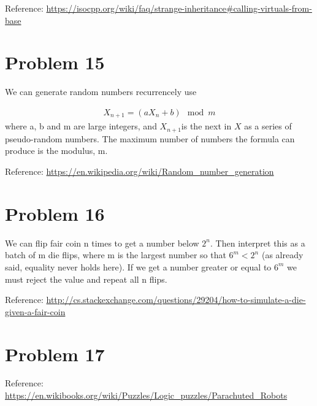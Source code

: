 \documentclass[12pt]{amsart}
\begin{document}
\begin{framed}

\end{framed}
 
 


Reference: \url{https://isocpp.org/wiki/faq/strange-inheritance#calling-virtuals-from-base}


\section{Problem 15}

We can generate random numbers recurrencely use

\begin{eqnarray*}
	X_{n+1} = (aX_n+b)\mod m
\end{eqnarray*}
where a, b and m are large integers, and $X_{n+1}$is the next in $X$ as a series of pseudo-random numbers. The maximum number of numbers the formula can produce is the modulus, m.

Reference: \url{https://en.wikipedia.org/wiki/Random_number_generation}


\section{Problem 16}
We can flip fair coin n times to get a number below $2^n$. Then interpret this as a batch of m die flips, where m is the largest number so that $6^m<2^n$ (as already said, equality never holds here). If we get a number greater or equal to $6^m$ we must reject the value and repeat all n flips.


Reference: \url{http://cs.stackexchange.com/questions/29204/how-to-simulate-a-die-given-a-fair-coin}


\section{Problem 17}

\begin{framed}

\end{framed}
 
 

Reference: \url{https://en.wikibooks.org/wiki/Puzzles/Logic_puzzles/Parachuted_Robots}
\end{document}
